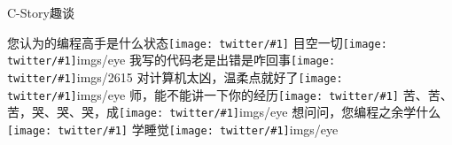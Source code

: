 \documentclass[t, fragile, xcolor=svgnames]{ctexbeamer}
\newcommand{\emoji}[1]{\texttt{[image: twitter/\#1]}}
\begin{document}
\begin{frame}[fragile, t]{C-Story}{趣谈}
\begin{center}
{\begin{qqminipage}
        {您认为的编程高手是什么状态\emoji{1F60B}}%
        {目空一切\emoji{1F609}}{imgs/eye}%
        {我写的代码老是出错是咋回事\emoji{1F63E}}{imgs/2615}%
        {对计算机太凶，温柔点就好了\emoji{1F627}}{imgs/eye}%
        {师，能不能讲一下你的经历\emoji{1F633}}%
        {苦、苦、苦，哭、哭、哭，成\emoji{1F637}}{imgs/eye}%
        {想问问，您编程之余学什么\emoji{1F608}}%
        {学睡觉\emoji{1F634}}{imgs/eye}%
      \end{qqminipage}
    }
  \end{center}  
\end{frame}

\end{document}
